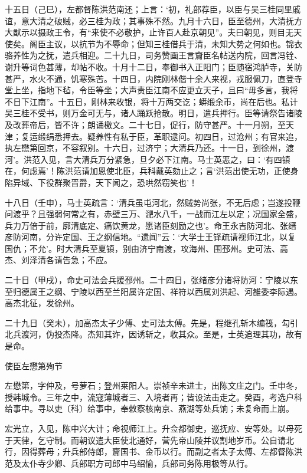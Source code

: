 \documentclass[]{article}
\begin{document}
十五日（己巳），左都督陈洪范南还；上言：`初，礼部荐臣，以臣与吴三桂同里戚谊，意大清之破贼，必三桂为政；其事殊不然。九月十六日，臣至德州，大清抚方大猷示以摄政王令，有``来使不必敬护，止许百人赴京朝见''。夫曰朝见，则目无天使矣。阁臣主议，以抗节为不辱命；但知三桂借兵于清，未知大势之何如也。锦衣骆养性为之抚，遣兵相迎。二十九日，司务赞画王言齎臣名帖送内院，回言冯铨、谢升等词色甚薄，却帖不收。十月十二日，奉御书入正阳门；臣随宿鸿胪寺，关防甚严，水火不通，饥寒殊苦。十四日，内院刚林偕十余人来视，戎服佩刀，直登寺堂上坐，指地下毡，令臣等坐；大声责臣江南不应更立天子，且曰``毋多言，我将不日下江南''。十五日，刚林来收银，将十万两交讫；蟒缎余币，尚在后也。私计吴三桂不受书，则万金可无与，诸人踊跃抢散。明日，遣兵押行。臣等请祭告诸陵及改葬帝后，皆不许；朗诵檄文。二十七日，促行，防守甚严。十一月朔，至天津；复运缎绢悉押去。疑养性有私于臣，革职逮问。初四日，过沧州；有官来追，执左懋第回京，不容叙别。十六日，过济宁；大清兵乃还。十一日，到徐州，渡河'。洪范入见，言大清兵万分紧急，旦夕必下江南。马士英恶之，曰：`有四镇在，何虑焉'！陈洪范请加恩使北臣，兵科戴英劾止之；言`洪范出使无功，正使身陷异域、下役群聚晋爵，天下闻之，恐哄然窃笑也'！

十八日（壬申），马士英疏言：`清兵虽屯河北，然贼势尚张，不无后虑；岂遂投鞭问渡乎？且强弱何常之有，赤壁三万、淝水八千，一战而江左以定；况国家全盛，兵力万倍于前，廓清底定、痛饮黄龙，愿诸臣刻励之也'。命王永吉防河北、张缙彦防河南，分许定国、王之纲信地。``遗闻''云：`大学士王铎疏请视师江北，以复国仇；不允'。时大清兵至夏镇，别由济宁南渡，攻海州、围邳州。史可法、高杰、刘泽清各请告急；不应。

二十日（甲戌），命史可法会兵援邳州。二十四日，张绪彦分诸将防河：宁陵以东至归德属王之纲、宁陵以西至兰阳属许定国、祥符以西属刘洪起、河雒委李际遇。高杰北征，发徐州。

二十九日（癸未），加高杰太子少傅、史可法太傅。先是，程继孔斩木编筏，勾引北兵渡河，伪投杰降。杰知其诈，因诱斩之，收其众。至是，士英追理其功，故有是命。

使臣左懋第殉节

左懋第，字仲及，号萝石；登州莱阳人。崇祯辛未进士，出陈文庄之门。壬申冬，授韩城令。三年之中，流寇薄城者三、入境者再；皆设法击走之。癸酉，考选户科给事中。寻以吏〔科〕给事中，奉敕察核南京、燕湖等处兵饷；未复命而上崩。

宏光立，入见，陈中兴大计；命视师江上。升佥都御史，巡抚应、安等处。以母死于天律，乞守制。而朝议遣大臣使北通好，营先帝山陵并议割地岁币。公自请北行，因得葬母；升兵部侍郎，齎国书、金币以行。而副之者太子太傅、左都督陈洪范及太仆寺少卿、兵部职方司郎中马绍愉，兵部司务陈用极等从行。
\end{document}
